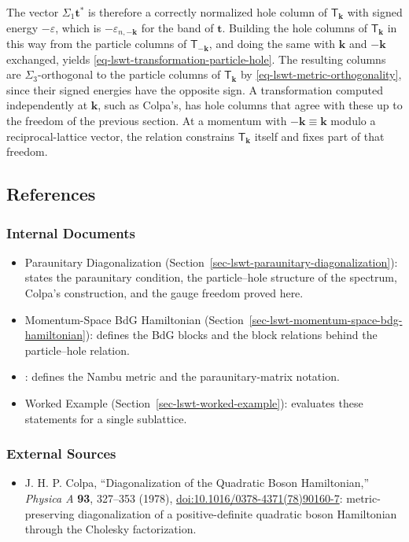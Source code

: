 The vector \(\Sigma_1\mathbf t^*\) is therefore a correctly normalized hole column of \(\mathsf T_{\mathbf k}\) with signed energy \(-\varepsilon\), which is \(-\varepsilon_{n,-\mathbf k}\) for the band of \(\mathbf t\). Building the hole columns of \(\mathsf T_{\mathbf k}\) in this way from the particle columns of \(\mathsf T_{-\mathbf k}\), and doing the same with \(\mathbf k\) and \(-\mathbf k\) exchanged, yields \eqref{eq-lswt-transformation-particle-hole}. The resulting columns are \(\Sigma_3\)-orthogonal to the particle columns of \(\mathsf T_{\mathbf k}\) by \eqref{eq-lswt-metric-orthogonality}, since their signed energies have the opposite sign. A transformation computed independently at \(\mathbf k\), such as Colpa's, has hole columns that agree with these up to the freedom of the previous section. At a momentum with \(-\mathbf k\equiv\mathbf k\) modulo a reciprocal-lattice vector, the relation constrains \(\mathsf T_{\mathbf k}\) itself and fixes part of that freedom.

\subsection{References}

\subsubsection{Internal Documents}

\begin{itemize}
\tightlist
\item
  Paraunitary Diagonalization (Section~\ref{sec-lswt-paraunitary-diagonalization}): states the paraunitary condition, the particle--hole structure of the spectrum, Colpa's construction, and the gauge freedom proved here.
\item
  Momentum-Space BdG Hamiltonian (Section~\ref{sec-lswt-momentum-space-bdg-hamiltonian}): defines the BdG blocks and the block relations behind the particle--hole relation.
\item
  : defines the Nambu metric and the paraunitary-matrix notation.
\item
  Worked Example (Section~\ref{sec-lswt-worked-example}): evaluates these statements for a single sublattice.
\end{itemize}

\subsubsection{External Sources}

\begin{itemize}
\tightlist
\item
  J. H. P. Colpa, ``Diagonalization of the Quadratic Boson Hamiltonian,'' \emph{Physica A} \textbf{93}, 327--353 (1978), \href{https://doi.org/10.1016/0378-4371(78)90160-7}{doi:10.1016/0378-4371(78)90160-7}: metric-preserving diagonalization of a positive-definite quadratic boson Hamiltonian through the Cholesky factorization.
\end{itemize}
